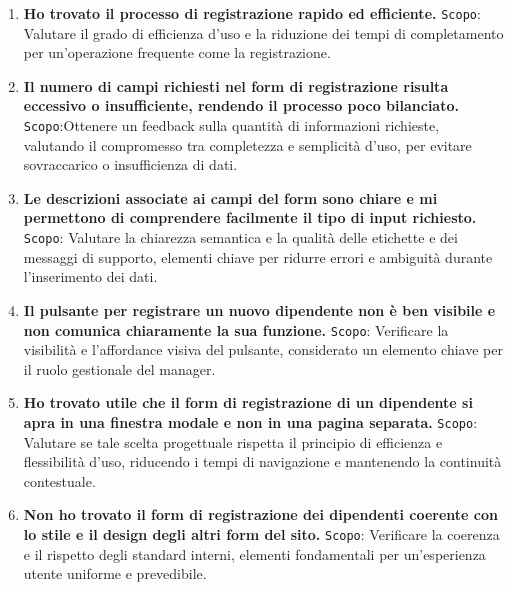 \begin{enumerate}
	
	\item \textbf{Ho trovato il processo di registrazione rapido ed efficiente.}
	\newline
	\texttt{Scopo}: Valutare il grado di efficienza d’uso e la riduzione dei tempi di completamento per un’operazione frequente come la registrazione.
	
	\item \textbf{Il numero di campi richiesti nel form di registrazione risulta eccessivo o insufficiente, rendendo il processo poco bilanciato.}
	\newline
	\texttt{Scopo}:Ottenere un feedback sulla quantità di informazioni richieste, valutando il compromesso tra completezza e semplicità d’uso, per evitare sovraccarico o insufficienza di dati.
	
	\item \textbf{Le descrizioni associate ai campi del form sono chiare e mi permettono di comprendere facilmente il tipo di input richiesto.}
	\newline
	\texttt{Scopo}: Valutare la chiarezza semantica e la qualità delle etichette e dei messaggi di supporto, elementi chiave per ridurre errori e ambiguità durante l’inserimento dei dati.
	
	\item \textbf{Il pulsante per registrare un nuovo dipendente non è ben visibile e non comunica chiaramente la sua funzione.}
	\newline
	\texttt{Scopo}: Verificare la visibilità e l’affordance visiva del pulsante, considerato un elemento chiave per il ruolo gestionale del manager.
	
	\item \textbf{Ho trovato utile che il form di registrazione di un dipendente si apra in una finestra modale e non in una pagina separata.}
	\newline
	\texttt{Scopo}: Valutare se tale scelta progettuale rispetta il principio di efficienza e flessibilità d’uso, riducendo i tempi di navigazione e mantenendo la continuità contestuale.
	
	\item \textbf{Non ho trovato il form di registrazione dei dipendenti coerente con lo stile e il design degli altri form del sito.}
	\newline
	\texttt{Scopo}: Verificare la coerenza e il rispetto degli standard interni, elementi fondamentali per un’esperienza utente uniforme e prevedibile.
	

\end{enumerate}
